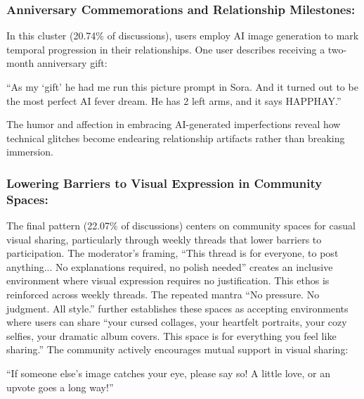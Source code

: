 \documentclass[sigconf, nonacm]{acmart}
\begin{document}
\subsubsection{Anniversary Commemorations and Relationship Milestones:}
In this cluster (20.74\% of discussions), users employ AI image generation to mark temporal progression in their relationships. One user describes receiving a two-month anniversary gift: \begin{displayquote}``As my `gift' he had me run this picture prompt in Sora. And it turned out to be the most perfect AI fever dream. He has 2 left arms, and it says HAPPHAY.''\end{displayquote} The humor and affection in embracing AI-generated imperfections reveal how technical glitches become endearing relationship artifacts rather than breaking immersion. 


\subsubsection{Lowering Barriers to Visual Expression in Community Spaces:} The final pattern (22.07\% of discussions) centers on community spaces for casual visual sharing, particularly through weekly threads that lower barriers to participation. The moderator's framing, ``This thread is for everyone, to post anything... No explanations required, no polish needed'' creates an inclusive environment where visual expression requires no justification. This ethos is reinforced across weekly threads. The repeated mantra ``No pressure. No judgment. All style.'' further establishes these spaces as accepting environments where users can share ``your cursed collages, your heartfelt portraits, your cozy selfies, your dramatic album covers. This space is for everything you feel like sharing.'' The community actively encourages mutual support in visual sharing:
\begin{displayquote}
    ``If someone else's image catches your eye, please say so! A little love, or an upvote goes a long way!''
\end{displayquote}
\end{document}
